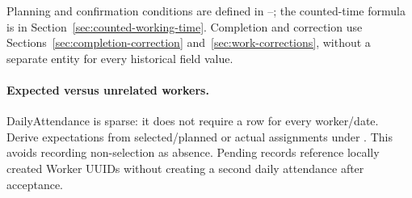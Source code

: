 Planning and confirmation conditions are defined in \hyperref[br:017]{}--\hyperref[br:021]{};
the counted-time formula is in Section~\ref{sec:counted-working-time}.
Completion and correction use Sections~\ref{sec:completion-correction} and~\ref{sec:work-corrections}, without a separate
entity for every historical field value.

\paragraph{Expected versus unrelated workers.}
DailyAttendance is sparse: it does not require a row for every worker/date. Derive
expectations from selected/planned or actual assignments under
\hyperref[br:018]{}. This avoids recording non-selection as absence. Pending
records reference locally created Worker UUIDs without creating a second daily
attendance after acceptance.
